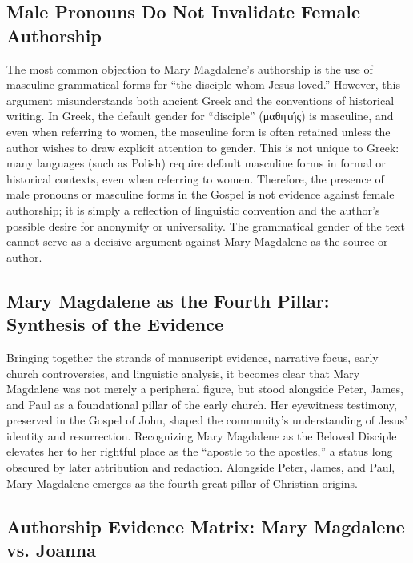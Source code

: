 \subsection{Male Pronouns Do Not Invalidate Female Authorship}\label{subsec:the-authorship-of-mary-is-typically-dismissed-as-a-possibility-because-of-the-use-of-male-pronouns-in-the-gospel.}

The most common objection to Mary Magdalene’s authorship is the use of masculine grammatical forms for “the disciple whom Jesus loved.” However, this argument misunderstands both ancient Greek and the conventions of historical writing. In Greek, the default gender for “disciple” (μαθητής) is masculine, and even when referring to women, the masculine form is often retained unless the author wishes to draw explicit attention to gender. This is not unique to Greek: many languages (such as Polish) require default masculine forms in formal or historical contexts, even when referring to women. Therefore, the presence of male pronouns or masculine forms in the Gospel is not evidence against female authorship; it is simply a reflection of linguistic convention and the author’s possible desire for anonymity or universality. The grammatical gender of the text cannot serve as a decisive argument against Mary Magdalene as the source or author.

\subsection{Mary Magdalene as the Fourth Pillar: Synthesis of the Evidence}\label{subsec:mary-magdalene-as-the-fourth-pillar-synthesis}

Bringing together the strands of manuscript evidence, narrative focus, early church controversies, and linguistic analysis, it becomes clear that Mary Magdalene was not merely a peripheral figure, but stood alongside Peter, James, and Paul as a foundational pillar of the early church. Her eyewitness testimony, preserved in the Gospel of John, shaped the community’s understanding of Jesus’ identity and resurrection. Recognizing Mary Magdalene as the Beloved Disciple elevates her to her rightful place as the “apostle to the apostles,” a status long obscured by later attribution and redaction. Alongside Peter, James, and Paul, Mary Magdalene emerges as the fourth great pillar of Christian origins.

\subsection{Authorship Evidence Matrix: Mary Magdalene vs. Joanna}\label{subsec:authorship-evidence-matrix}

